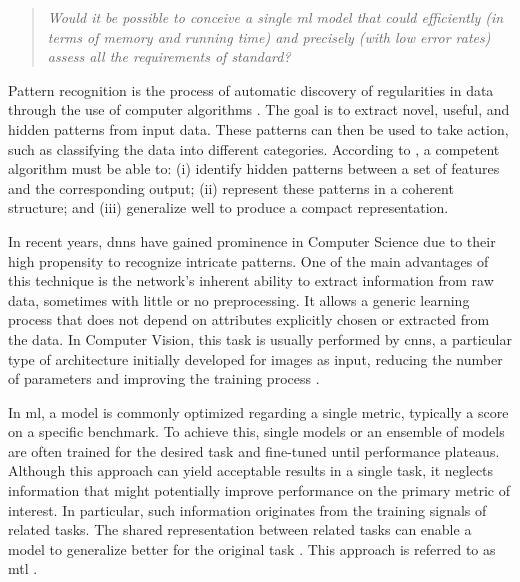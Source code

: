 \begin{quote}\emph{Would it be possible to conceive a single \acl{ml} model that could efficiently (in terms of memory and running time) and precisely (with low error rates) assess all the requirements of \icao standard?}\end{quote}

Pattern recognition is the process of automatic discovery of regularities in data through the use of computer algorithms \citep{bishop2006pattern}. The goal is to extract novel, useful, and hidden patterns from input data. These patterns can then be used to take action, such as classifying the data into different categories. According to \cite{orriols2008genetic}, a competent algorithm must be able to: (i) identify hidden patterns between a set of features and the corresponding output; (ii) represent these patterns in a coherent structure; and (iii) generalize well to produce a compact representation.
 
In recent years, \acfp{dnn} have gained prominence in Computer Science due to their high propensity to recognize intricate patterns. One of the main advantages of this technique is the network's inherent ability to extract information from raw data, sometimes with little or no preprocessing. It allows a generic learning process that does not depend on attributes explicitly chosen or extracted from the data. In Computer Vision, this task is usually performed by \acfp{cnn}, a particular type of architecture initially developed for images as input, reducing the number of parameters and improving the training process \citep{goodfellow2016deep}.
 
In \acf{ml}, a model is commonly optimized regarding a single metric, typically a score on a specific benchmark. To achieve this, single models or an ensemble of models are often trained for the desired task and fine-tuned until performance plateaus. Although this approach can yield acceptable results in a single task, it neglects information that might potentially improve performance on the primary metric of interest. In particular, such information originates from the training signals of related tasks. The shared representation between related tasks can enable a model to generalize better for the original task \citep{ruder2017overview}. This approach is referred to as \acf{mtl} \citep{Caruana1997}.
 
